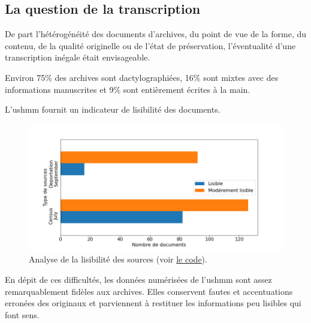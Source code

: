 \documentclass[a4paper,12pt,twoside]{book}
\begin{document}
			\subsection{La question de la transcription}
			 
			    De part l'hétérogénéité des documents d'archives, du point de vue de la forme, du contenu, de la qualité originelle ou de l'état de préservation, l'éventualité d'une transcription inégale était envisageable.
			    
			    Environ 75\% des archives sont dactylographiées, 16\% sont mixtes avec des informations manuscrites et 9\% sont entièrement écrites à la main.
			    
			    L'\gls{ushmm} fournit un indicateur de lisibilité des documents.
			    
			    \begin{figure}[!ht]
        			\centering
                    \includegraphics[width=\textwidth]{images/sources_legibility.png}
                    \vspace{-2em}
                    \caption{Analyse de la lisibilité des sources (voir \hyperref[analyse3]{le code}).}
                    \label{fig13}
                \end{figure}
                
                En dépit de ces difficultés, les données numérisées de l'\gls{ushmm} sont assez remarquablement fidèles aux archives. Elles conservent fautes et accentuations erronées des originaux et parviennent à restituer les informations peu lisibles qui font sens.
                
\end{document}
